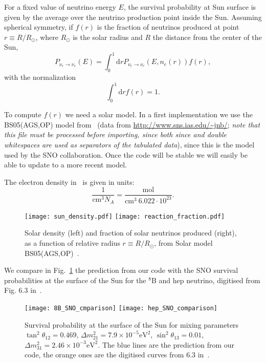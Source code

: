 \documentclass{article}
\newcommand{\cm}[0]{\text{cm}}
\newcommand{\de}[0]{\text{d}}
\begin{document}
For a fixed value of neutrino energy $E$, the survival probability at Sun surface is given by the average over the neutrino production point inside the Sun. Assuming spherical symmetry, if $f(r)$ is the fraction of neutrinos produced at point $r \equiv R/R_\odot$, where $R_\odot$ is the solar radius and $R$ the distance from the center of the Sun, 
\begin{equation}
	P_{\nu_e \rightarrow \nu_e}(E) = \int_0^1 \de r P_{\nu_e \rightarrow \nu_e}(E, n_e(r)) f(r),
\end{equation}
with the normalization
\begin{equation}
	\int_0^1 \de r f(r) = 1.
\end{equation}

To compute $f(r)$ we need a solar model. In a first implementation we use the BS05(AGS,OP) model from~\cite{Bahcall:2004pz} (data from \url{http://www.sns.ias.edu/~jnb/}; \emph{note that this file must be processed before importing, since both since and double whitespaces are used as separators of the tabulated data}), since this is the model used by the SNO collaboration. Once the code will be stable we will easily be able to update to a more recent model.

The electron density in~\cite{Bahcall:2004pz} is given in units:
\begin{equation}
	\frac{1}{\cm^3 N_A} = \frac{\text{mol}}{\cm^3\ 6.022 \cdot 10^{23} }.
\end{equation}
	
\begin{figure}[htb]
\texttt{[image: sun\_density.pdf]}
\texttt{[image: reaction\_fraction.pdf]}
\caption{Solar density (left) and fraction of solar neutrinos produced (right), as a function of relative radius $r \equiv R/R_\odot$, from Solar model BS05(AGS,OP)~\cite{Bahcall:2004pz}.}
\end{figure}

We compare in Fig.~\ref{fig:SNO_8B_hep_comparison} the prediction from our code with the SNO survival probabilities at the surface of the Sun for the ${}^8$B and hep neutrino, digitised from Fig. 6.3 in~\cite{FiuzadeBarros:2011qna}. 

\begin{figure}[htb]
	\texttt{[image: 8B\_SNO\_cmparison]}
	\texttt{[image: hep\_SNO\_comparison]}
	\caption{Survival probability at the surface of the Sun for mixing parameters $\tan^2\theta_{12} = 0.469$, $\Delta m_{21}^2 = 7.9 \times 10^{-5} \text{eV}^2$, $\sin^2 \theta_{13} = 0.01$, $\Delta m_{31}^2 = 2.46 \times 10^{-3} \text{eV}^2$. The blue lines are the prediction from our code, the orange ones are the digitised curves from 6.3 in~\cite{FiuzadeBarros:2011qna}.}
	\label{fig:SNO_8B_hep_comparison}
\end{figure}
\end{document}
